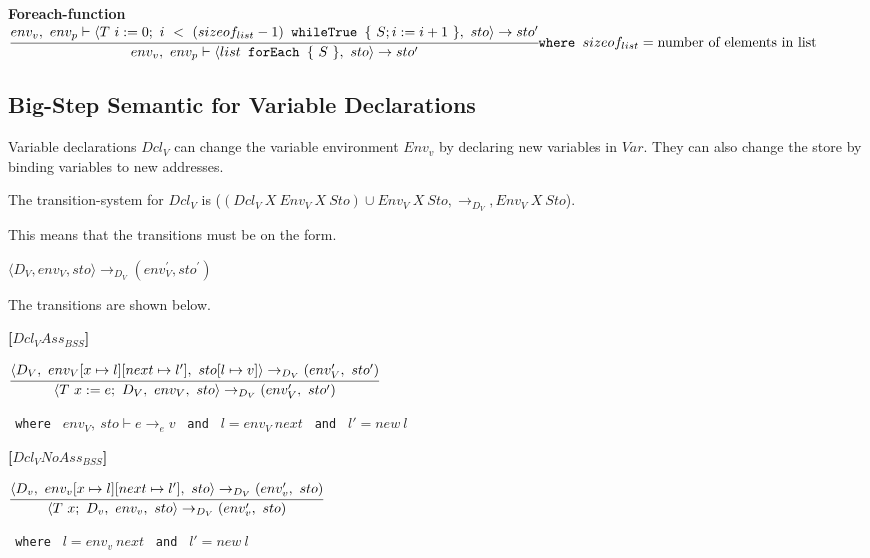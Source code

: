 \textbf{Foreach-function}\\
\begin{math}
	\cfrac
		{env_v,\ env_p \vdash \langle T\ i := 0;\ i\ <\ (sizeof_{list} - 1) \texttt{ whileTrue } \{\ S;i := i + 1\ \},\ sto \rangle \rightarrow sto'}
		{env_v,\ env_p \vdash \langle list \texttt{ forEach } \{\ S\ \},\ sto \rangle \rightarrow sto'}\\
		\texttt{where } sizeof_{list} = \text{number of elements in list}
\end{math}

















\subsection{Big-Step Semantic for Variable Declarations}
Variable declarations $Dcl_V$ can change the variable environment $Env_v$ by declaring new variables in $Var$.
They can also change the store by binding variables to new addresses.

The transition-system for $Dcl_V$ is ($(Dcl_V\ X\ Env_V\ X\ Sto) \cup Env_V\ X\ Sto, \rightarrow_{D_{V}}, Env_V\ X\ Sto$).

This means that the transitions must be on the form.

\begin{center}
	$\langle D_V,env_V,sto \rangle \rightarrow_{D_V} (env_V^{'} , sto^{'})$
\end{center}

The transitions are shown below.

\textbf{[$Dcl_V Ass_{BSS}$]}\\
\begin{center}
	\begin{math}
	\cfrac
		{\langle D_V,\ env_V[x \mapsto l][next \mapsto l'],\ sto[l \mapsto v] \rangle \rightarrow_{D_V} (env_V',\ sto')}
		{\langle T\ x := e;\ D_V,\ env_V,\ sto \rangle \rightarrow_{D_V} (env_V',\ sto')}
	\end{math}
	
	\texttt{ where } $env_V,\ sto \vdash e \rightarrow_e v$
	\texttt{ and } $l = env_V\ next$
	\texttt{ and } $l' = new\ l$
\end{center}

\textbf{[$Dcl_V NoAss_{BSS}$]}\\
\begin{center}
	\begin{math}
	\cfrac
		{\langle D_v,\ env_v[x \mapsto l][next \mapsto l'],\ sto \rangle \rightarrow_{D_V} (env_v',\ sto)}
		{\langle T\ x;\ D_v,\ env_v,\ sto \rangle \rightarrow_{D_V} (env_v',\ sto)}
	\end{math}
	
	\texttt{ where } $l = env_v\ next$
	\texttt{ and } $l' = new\ l$
\end{center}

